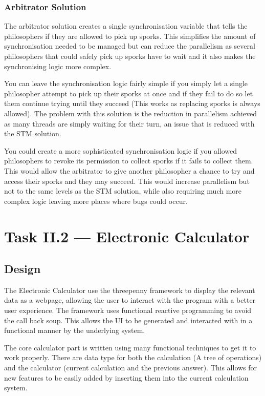 \documentclass[a4paper]{article}
\begin{document}
\subsubsection{Arbitrator Solution}
The arbitrator solution creates a single synchronisation variable that tells the philosophers if they are allowed to pick up sporks.
This simplifies the amount of synchronisation needed to be managed but can reduce the parallelism as several philosophers that could safely pick up sporks have to wait and it also makes the synchronising logic more complex.
\par
You can leave the synchronisation logic fairly simple if you simply let a single philosopher attempt to pick up their sporks at once and if they fail to do so let them continue trying until they succeed (This works as replacing sporks is always allowed).
The problem with this solution is the reduction in parallelism achieved as many threads are simply waiting for their turn, an issue that is reduced with the STM solution.
\par
You could create a more sophisticated synchronisation logic if you allowed philosophers to revoke its permission to collect sporks if it fails to collect them.
This would allow the arbitrator to give another philosopher a chance to try and access their sporks and they may succeed.
This would increase parallelism but not to the same levels as the STM solution, while also requiring much more complex logic leaving more places where bugs could occur.

\section{Task II.2 --- Electronic Calculator}

\subsection{Design}
The Electronic Calculator use the threepenny framework to display the relevant data as a webpage, allowing the user to interact with the program with a better user experience.
The framework uses functional reactive programming to avoid the call back soup.
This allows the UI to be generated and interacted with in a functional manner by the underlying system.
\par
The core calculator part is written using many functional techniques to get it to work properly.
There are data type for both the calculation (A tree of operations) and the calculator (current calculation and the previous answer).
This allows for new features to be easily added by inserting them into the current calculation system.
\end{document}
